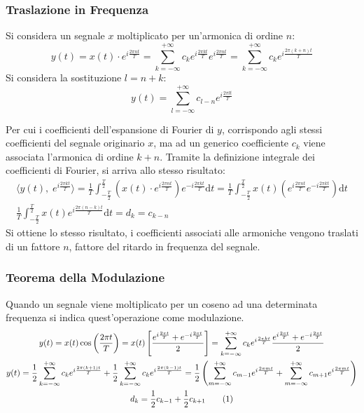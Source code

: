 \documentclass{article}
\newcommand{\df}{\mathrm{d}}
\newcommand{\tageq}{\tag{\stepcounter{equation}\theequation}}
\numberwithin{equation}{subsection}
\begin{document}
\subsubsection{Traslazione in Frequenza}

Si considera un segnale $x$ moltiplicato per un'armonica di ordine $n$:
\begin{equation*}
    y(t)=x(t)\cdot e^{i\frac{2\pi nt}{T}}=\displaystyle\sum_{k=-\infty}^{+\infty}c_ke^{i\frac{2\pi kt}{T}}e^{i\frac{2\pi nt}{T}}=\sum_{k=-\infty}^{+\infty}c_ke^{i\frac{2\pi (k+n)t}{T}}
\end{equation*}
Si considera la sostituzione $l=n+k$:
\begin{equation}
    y(t)=\displaystyle\sum_{l=-\infty}^{+\infty}c_{l-n}e^{i\frac{2\pi lt}{T}}
\end{equation}

Per cui i coefficienti dell'espansione di Fourier di $y$, corrispondo agli stessi coefficienti del segnale originario $x$, ma ad un generico coefficiente $c_k$ viene 
associata l'armonica di ordine $k+n$.   
Tramite la definizione integrale dei coefficienti di Fourier, si arriva allo stesso risultato:
\begin{gather*}
    \langle y(t),\;e^{i\frac{2\pi kt}{T}}\rangle=\displaystyle\frac{1}{T}\int_{-\frac{T}{2}}^{\frac{T}{2}}\left(x(t)\cdot e^{i\frac{2\pi nt}{T}}\right)e^{-i\frac{2\pi kt}{T}}\df t=\frac{1}{T}\int_{-\frac{T}{2}}^{\frac{T}{2}}x(t)\left(e^{i\frac{2\pi nt}{T}}e^{-i\frac{2\pi kt}{T}}\right)\df t\\
    \displaystyle\frac{1}{T}\int_{-\frac{T}{2}}^{\frac{T}{2}}x(t)e^{i\frac{2\pi (n-k)t}{T}}\df t=d_k=c_{k-n}
\end{gather*}
Si ottiene lo stesso risultato, i coefficienti associati alle armoniche vengono traslati di un fattore $n$, fattore del ritardo in frequenza del segnale.  

\subsubsection{Teorema della Modulazione}

Quando un segnale viene moltiplicato per un coseno ad una determinata frequenza si indica quest'operazione come modulazione. 
\begin{gather*}
    y(t)=x(t)\cos\displaystyle\left(\frac{2\pi t}{T}\right)=x(t)\left[\frac{e^{i\frac{2\pi t}{T}}+e^{-i\frac{2\pi t}{T}}}{2}\right]=\sum_{k=-\infty}^{+\infty}c_ke^{i\frac{2\pi kt}{T}}\frac{e^{i\frac{2\pi t}{T}}+e^{-i\frac{2\pi t}{T}}}{2}\\
    y(t)=\displaystyle\frac{1}{2}\sum_{k=-\infty}^{+\infty}c_ke^{i\frac{2\pi (k+1)t}{T}}+\frac{1}{2}\sum_{k=-\infty}^{+\infty}c_ke^{i\frac{2\pi (k-1)t}{T}}=\frac{1}{2}\left(\sum_{m=-\infty}^{+\infty}c_{m-1}e^{i\frac{2\pi mt}{T}}+\sum_{m=-\infty}^{+\infty}c_{m+1}e^{i\frac{2\pi mt}{T}}\right)\\
    d_k=\displaystyle\frac{1}{2}c_{k-1}+\frac{1}{2}c_{k+1}\tageq
\end{gather*}
\end{document}

